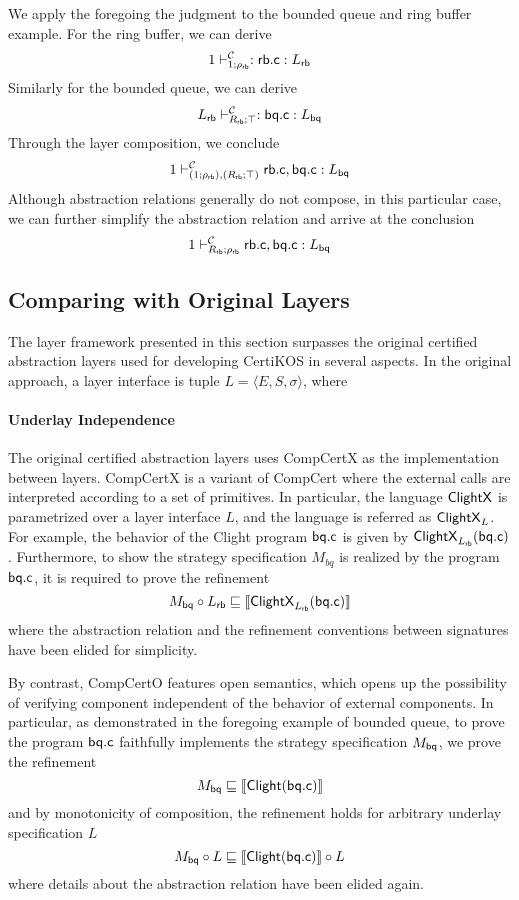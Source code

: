 \documentclass[sigplan,10pt,authordraft]{acmart}
\begin{document}
\begin{example}
  We apply the foregoing the judgment to the bounded queue and ring buffer
  example. For the ring buffer, we can derive
  \[
    1 \vdash^\mathcal{C}_{1;\rho_{ \mathsf{rb} }} :  \mathsf{rb.c}  : L_{ \mathsf{rb} }
  \]
  Similarly for the bounded queue, we can derive
  \[
    L_{ \mathsf{rb} } \vdash^\mathcal{C}_{R_{ \mathsf{rb} };\top} :  \mathsf{bq.c}  : L_{ \mathsf{bq} }
  \]
  Through the layer composition, we conclude
  \[
    1 \vdash^\mathcal{C}_{(1;\rho_{ \mathsf{rb} }), (R_{ \mathsf{rb} };\top)}
     \mathsf{rb.c} ,  \mathsf{bq.c}  : L_{ \mathsf{bq} }
  \]
  Although abstraction relations generally do not compose, in this particular
  case, we can further simplify the abstraction relation and arrive at the
  conclusion
  \[
    1 \vdash^\mathcal{C}_{R_{ \mathsf{rb} };\rho_{ \mathsf{rb} }}  \mathsf{rb.c} ,  \mathsf{bq.c}  : L_{ \mathsf{bq} }
  \]
\end{example}

\subsection{Comparing with Original Layers}

The layer framework presented in this section
surpasses the original certified abstraction layers
used for developing CertiKOS
in several aspects.
In the original approach,
a layer interface is tuple $L = \langle E, S, \sigma \rangle$,
where

\paragraph{Underlay Independence}
The original certified abstraction layers uses CompCertX
as the implementation between layers.
CompCertX is a variant of CompCert
where the external calls are interpreted
according to a set of primitives.
In particular,
the language $ \mathsf{ClightX} $ is parametrized
over a layer interface $L$,
and the language is referred as $ \mathsf{ClightX} _L$.
For example,
the behavior of the Clight program $ \mathsf{bq.c} $
is given by $ \mathsf{ClightX} _{L_{ \mathsf{rb} }}( \mathsf{bq.c} )$.
Furthermore, to show the strategy specification $M_{bq}$
is realized by the program $ \mathsf{bq.c} $,
it is required to prove the refinement
\[
  M_{ \mathsf{bq} } \circ L_{ \mathsf{rb} } \sqsubseteq
  \llbracket  \mathsf{ClightX} _{L_{ \mathsf{rb} }}( \mathsf{bq.c} ) \rrbracket
\]
where the abstraction relation and
the refinement conventions between signatures
have been elided for simplicity.

By contrast,
CompCertO features open semantics,
which opens up the possibility of
verifying component independent of
the behavior of external components.
In particular,
as demonstrated in the foregoing example of bounded queue,
to prove the program $ \mathsf{bq.c} $
faithfully implements the strategy specification $M_{ \mathsf{bq} }$,
we prove the refinement
\[
  M_{ \mathsf{bq} } \sqsubseteq \llbracket  \mathsf{Clight} ( \mathsf{bq.c} ) \rrbracket
\]
and by monotonicity of composition,
the refinement holds for arbitrary underlay specification $L$
\[
  M_{ \mathsf{bq} } \circ L \sqsubseteq \llbracket  \mathsf{Clight} ( \mathsf{bq.c} ) \rrbracket \circ L
\]
where details about the abstraction relation have been elided again.
\end{document}
